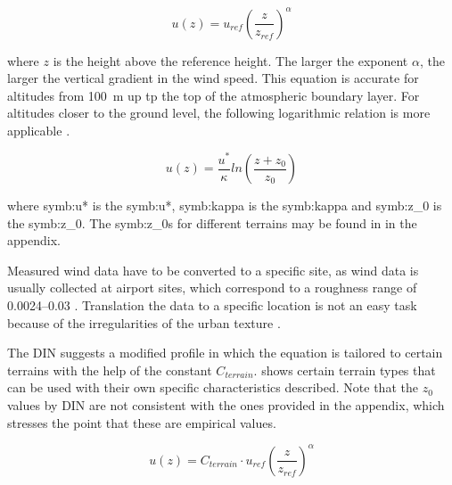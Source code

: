 \begin{equation}
u(z)=u_{ref}\left( \frac{z}{z_{ref}}\right )^\alpha
\label{eq:power_law}
\end{equation}


where $z$ is the height above the reference height. The larger the exponent $\alpha$, the larger the vertical gradient in the wind speed. This equation is accurate for altitudes from \SI{100}{\metre} up tp the top of the atmospheric boundary layer. 
For altitudes closer to the ground level, the following logarithmic relation is more applicable \citep{Ghiaus2012,Hucho2011}.

\begin{equation}
u(z) = \frac{u^*}{\kappa} ln \left( \frac{z+z_0}{z_0}\right)
\end{equation}

where \gls{symb:u*} is the \glsdesc{symb:u*}, \gls{symb:kappa} is the \glsdesc{symb:kappa} and \gls{symb:z_0} is the \glsdesc{symb:z_0}. The \glsdesc{symb:z_0}s for different terrains may be found in   in the appendix.

Measured wind data have to be converted to a specific site, as wind data is usually collected at airport sites, which correspond to a roughness range of \SIrange{0.0024}{0.03}{} \cite{Ragheb2016}. Translation the data to a specific location is not an easy task because of the irregularities of the urban texture \citep{Ratti2002}.

The \gls{DIN} \citep{DIN105542005} suggests a modified profile in which the equation is tailored to certain terrains with the help of the constant $C_{terrain}$.  shows certain terrain types that can be used with their own specific characteristics described.
Note that the $z_0$ values by \gls{DIN} are not consistent with the ones provided in the appendix, which stresses the point that these are empirical values. 

\begin{equation}
u(z)=C_{terrain} \cdot u_{ref}\left( \frac{z}{z_{ref}}\right )^\alpha
\end{equation}



